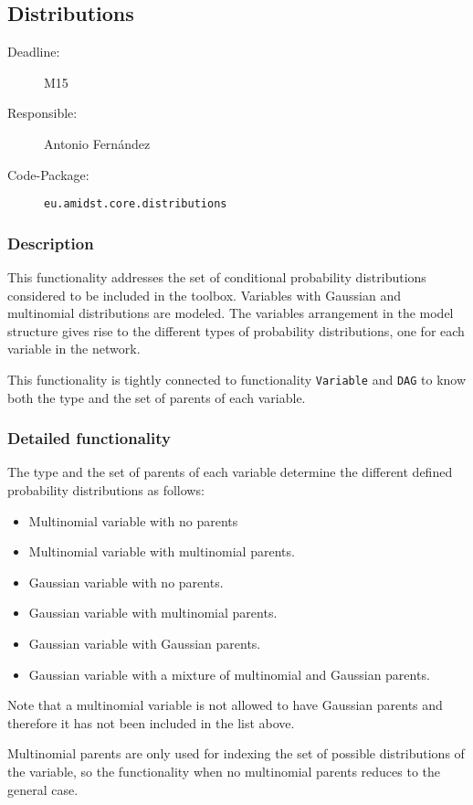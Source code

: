 \subsection{Distributions}
\label{Distributions:D}

\begin{description}
\item[Deadline:] M15
\item[Responsible:] Antonio Fern\'andez
\item[Code-Package:] \texttt{eu.amidst.core.distributions}
\end{description}

\subsubsection*{Description}

This functionality addresses the set of conditional probability distributions considered to be included in the toolbox. Variables with Gaussian and multinomial distributions are modeled. The variables arrangement in the model structure gives rise to the different types of probability distributions, one for each variable in the network. 

This functionality is tightly connected to functionality \texttt{Variable} and \texttt{DAG} to know both the type and the set of parents of each variable.

\subsubsection*{Detailed functionality}

The type and the set of parents of each variable determine the different defined probability distributions as follows:

\begin{itemize}
\item Multinomial variable with no parents
\item Multinomial variable with multinomial parents.
\item Gaussian variable with no parents.
\item Gaussian variable with multinomial parents.
\item Gaussian variable with Gaussian parents. 
\item Gaussian variable with a mixture of multinomial and Gaussian parents. 
\end{itemize}

Note that a multinomial variable is not allowed to have Gaussian parents and therefore it has not been included in the list above.

Multinomial parents are only used for indexing the set of possible distributions of the variable, so the functionality when no multinomial parents reduces to the general case.


